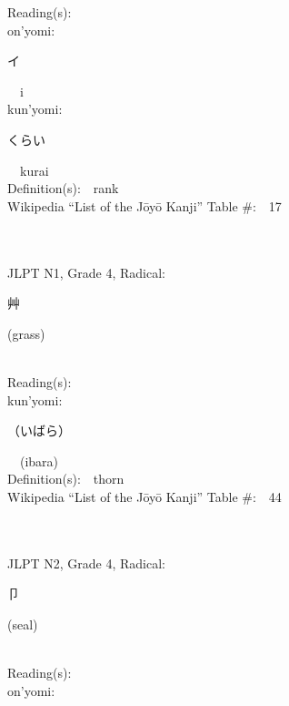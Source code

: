 \begin{multicols}{2}
Reading(s):\ \ \\
{\hspace*{1em}}on'yomi:\ \ \\
{\hspace*{2em}}{\begin{CJK}{UTF8}{min} イ \end{CJK}}\ \ i\ \ \\
{\hspace*{1em}}kun'yomi:\ \ \\
{\hspace*{2em}}{\begin{CJK}{UTF8}{min} くらい \end{CJK}}\ \ kurai\ \ \\
Definition(s):\ \ rank \\
Wikipedia ``List of the J\=oy\=o Kanji'' Table \#:\ \ 17 \\
\ \ \\
{\fontsize{34pt}{40pt}  }\ \ \\  %
{JLPT N1, Grade 4, Radical:\ \ {\begin{CJK}{UTF8}{min} 艸 \end{CJK}} (grass) } \\
Reading(s):\ \ \\
{\hspace*{1em}}kun'yomi:\ \ \\
{\hspace*{2em}}{\begin{CJK}{UTF8}{min} （いばら） \end{CJK}}\ \ (ibara)\ \ \\
Definition(s):\ \ thorn \\
Wikipedia ``List of the J\=oy\=o Kanji'' Table \#:\ \ 44 \\
\ \ \\
{\fontsize{34pt}{40pt}  }\ \ \\  %
{JLPT N2, Grade 4, Radical:\ \ {\begin{CJK}{UTF8}{min} 卩 \end{CJK}} (seal) } \\
Reading(s):\ \ \\
{\hspace*{1em}}on'yomi:\ \ \\

\end{multicols}
